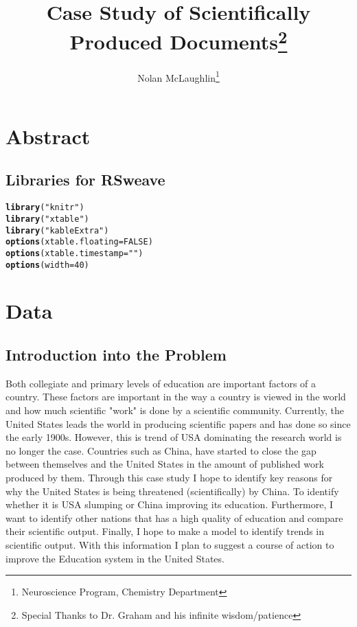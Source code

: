 \documentclass{article}\usepackage[]{graphicx}\usepackage[]{color}
\makeatletter
\newcommand{\hlnum}[1]{\textcolor[rgb]{0.686,0.059,0.569}{#1}}%
\newcommand{\hlstr}[1]{\textcolor[rgb]{0.192,0.494,0.8}{#1}}%
\newcommand{\hlstd}[1]{\textcolor[rgb]{0.345,0.345,0.345}{#1}}%
\newcommand{\hlkwc}[1]{\textcolor[rgb]{0.333,0.667,0.333}{#1}}%
\newcommand{\hlkwd}[1]{\textcolor[rgb]{0.737,0.353,0.396}{\textbf{#1}}}%
\newenvironment{kframe}{%
 \def\at@end@of@kframe{}%
 \ifinner\ifhmode%
  \def\at@end@of@kframe{\end{minipage}}%
  \begin{minipage}{\columnwidth}%
 \fi\fi%
 \def\FrameCommand##1{\hskip\@totalleftmargin \hskip-\fboxsep
 \colorbox{shadecolor}{##1}\hskip-\fboxsep
     \hskip-\linewidth \hskip-\@totalleftmargin \hskip\columnwidth}%
 \MakeFramed {\advance\hsize-\width
   \@totalleftmargin\z@ \linewidth\hsize
   \@setminipage}}%
 {\par\unskip\endMakeFramed%
 \at@end@of@kframe}
\newenvironment{knitrout}{}{} %
\makeatother
\begin{document}
\title {Case Study of Scientifically Produced Documents\thanks{Special Thanks to Dr. Graham and his infinite wisdom/patience}}
\author {Nolan McLaughlin\thanks{Neuroscience Program, Chemistry Department}}
\maketitle

\date{} %

\section{Abstract}
\subsection{Libraries for RSweave}
\begin{knitrout}
\color{fgcolor}\begin{kframe}
\begin{alltt}
\hlkwd{library}\hlstd{(}\hlstr{"knitr"}\hlstd{)}
\hlkwd{library}\hlstd{(}\hlstr{"xtable"}\hlstd{)}
\hlkwd{library}\hlstd{(}\hlstr{"kableExtra"}\hlstd{)}
\hlkwd{options}\hlstd{(}\hlkwc{xtable.floating} \hlstd{=} \hlnum{FALSE}\hlstd{)}
\hlkwd{options}\hlstd{(}\hlkwc{xtable.timestamp} \hlstd{=} \hlstr{""}\hlstd{)}
\hlkwd{options}\hlstd{(}\hlkwc{width}\hlstd{=}\hlnum{40}\hlstd{)}
\end{alltt}
\end{kframe}
\end{knitrout}
\section {Data}


\subsection{Introduction into the Problem}
Both collegiate and primary levels of education are important factors of a country. These factors are important in the way a country is viewed in the world and how much scientific "work" is done by a scientific community. Currently, the United States leads the world in producing scientific papers and has done so since the early 1900s.  However, this is trend of USA dominating the research world is no longer the case. Countries such as China, have started to close the gap between themselves and the United States in the amount of published work produced by them. 
  Through this case study I hope to identify key reasons for why the United States is being threatened (scientifically) by China. To identify whether it is USA slumping or China improving its education. Furthermore, I want to identify other nations that has a high quality of education and compare their scientific output. Finally, I hope to make a model to identify trends in scientific output. With this information I plan to suggest a course of action to improve the Education system in the United States.
\end{document}
